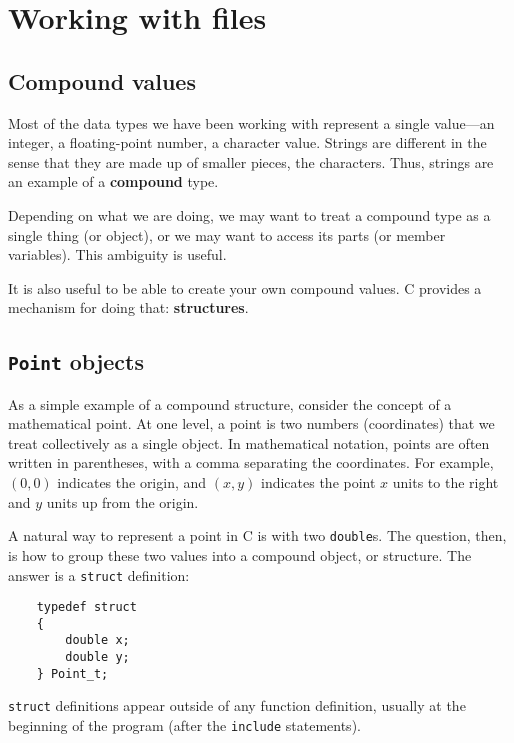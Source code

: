 
\chapter{Working with files}
\label{files}




\section{Compound values}

Most of the data types we have been working with represent a single
value---an integer, a floating-point number, a character value. 
Strings are different in the sense that they are made up of smaller
pieces, the characters.  Thus, strings are an example of a
{\bf compound} type. 

Depending on what we are doing, we may want to treat a compound type
as a single thing (or object), or we may want to access its parts (or
member variables).  This ambiguity is useful.

It is also useful to be able to create your own compound values.  
C provides a mechanism for doing that: {\bf structures}.  

\section{{\tt Point} objects}

As a simple example of a compound structure, consider the concept of a
mathematical point.  At one level, a point is two numbers
(coordinates) that we treat collectively as a single object.  In
mathematical notation, points are often written in parentheses, with a
comma separating the coordinates.  For example, $(0, 0)$ indicates the
origin, and $(x, y)$ indicates the point $x$ units to the right and
$y$ units up from the origin.

A natural way to represent a point in C is with two {\tt double}s.
The question, then, is how to group these two values into
a compound object, or structure.  The answer is a {\tt struct}
definition:

\begin{verbatim}
	typedef struct 
	{
		double x;
		double y;
	} Point_t;  
\end{verbatim}
%
{\tt struct} definitions appear outside of any function definition,
usually at the beginning of the program (after the {\tt include}
statements).

